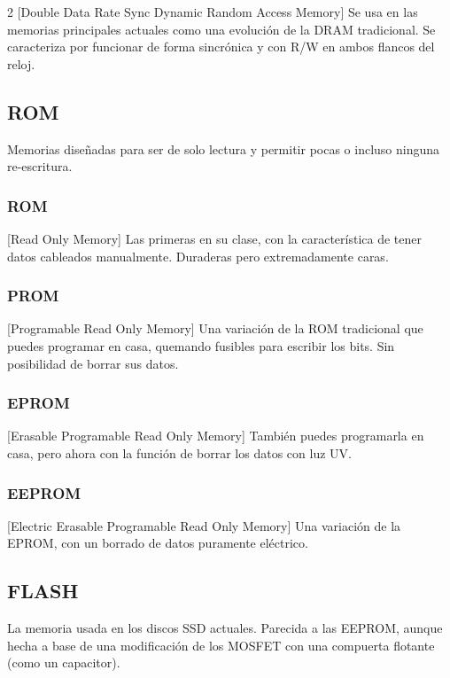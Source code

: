\documentclass{article}
\begin{document}
\begin{multicols}{2}
		[Double Data Rate Sync Dynamic Random Access Memory] Se usa en las memorias principales actuales como una evolución de la DRAM tradicional. Se caracteriza por funcionar de forma sincrónica y con R/W en ambos flancos del reloj.
		
		\subsection{ROM}
		
		Memorias diseñadas para ser de solo lectura y permitir pocas o incluso ninguna re-escritura.
		
		\subsubsection{ROM}
		
		[Read Only Memory] Las primeras en su clase, con la característica de tener datos cableados manualmente. Duraderas pero extremadamente caras.
		
		\subsubsection{PROM}
		
		[Programable Read Only Memory] Una variación de la ROM tradicional que puedes programar en casa, quemando fusibles para escribir los bits. Sin posibilidad de borrar sus datos.
		
		\subsubsection{EPROM}
		
		[Erasable Programable Read Only Memory] También puedes programarla en casa, pero ahora con la función de borrar los datos con luz UV.
		
		\subsubsection{EEPROM}
		
		[Electric Erasable Programable Read Only Memory] Una variación de la EPROM, con un borrado de datos puramente eléctrico.
		
		\subsection{FLASH}
		
		La memoria usada en los discos SSD actuales. Parecida a las EEPROM, aunque hecha a base de una modificación de los MOSFET con una compuerta flotante (como un capacitor).
	\end{multicols}
	
\end{document}
